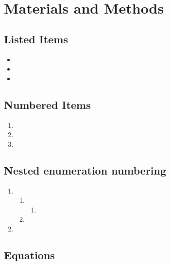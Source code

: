\chapter{Materials and Methods}
\label{ChapterMethods}

\section{Listed Items}

\begin{itemize}
    \item \lipsum[1][1-3]
    \item \lipsum[1][1-3]
    \item \lipsum[1][1-3]
\end{itemize}

\section{Numbered Items}

\begin{enumerate}
    \item \lipsum[1][1-3]
    \item \lipsum[1][1-3]
    \item \lipsum[1][1-3]
\end{enumerate}

\section{Nested enumeration numbering}

\begin{enumerate}
    \item \lipsum[1][1-3]
    \begin{enumerate}
        \item \lipsum[1][1-3]
        \begin{enumerate}
            \item \lipsum[1][1-3]
        \end{enumerate}
        \item \lipsum[1][1-3]
    \end{enumerate}
    \item \lipsum[1][1-3]
\end{enumerate}

\section{Equations}

